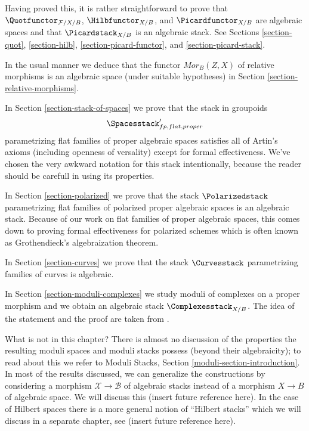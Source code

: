 \medskip\noindent
Having proved this, it is rather straightforward to prove that
$\Quotfunctor_{\mathcal{F}/X/B}$, $\Hilbfunctor_{X/B}$, and
$\Picardfunctor_{X/B}$ are algebraic spaces and that
$\Picardstack_{X/B}$ is an algebraic stack. See
Sections \ref{section-quot}, \ref{section-hilb},
\ref{section-picard-functor}, and \ref{section-picard-stack}.

\medskip\noindent
In the usual manner we deduce that the functor $\mathit{Mor}_B(Z, X)$
of relative morphisms is an algebraic space (under suitable
hypotheses) in Section \ref{section-relative-morphisms}.

\medskip\noindent
In Section \ref{section-stack-of-spaces} we prove that the stack in
groupoids
$$
\Spacesstack'_{fp, flat, proper}
$$
parametrizing flat families of proper algebraic spaces satisfies all
of Artin's axioms (including openness of versality) except for
formal effectiveness. We've chosen the very awkward notation for
this stack intentionally, because the reader should be carefull
in using its properties.

\medskip\noindent
In Section \ref{section-polarized} we prove that the stack
$\Polarizedstack$
parametrizing flat families of polarized proper algebraic spaces
is an algebraic stack. Because of our work on flat families of proper
algebraic spaces, this comes down to proving
formal effectiveness for polarized schemes which is often known
as Grothendieck's algebraization theorem.

\medskip\noindent
In Section \ref{section-curves} we prove that the stack
$\Curvesstack$ parametrizing families of curves is algebraic.

\medskip\noindent
In Section \ref{section-moduli-complexes}
we study moduli of complexes on a proper morphism
and we obtain an algebraic stack $\Complexesstack_{X/B}$.
The idea of the statement and the proof are taken from
\cite{lieblich-complexes}.

\medskip\noindent
What is not in this chapter? There is almost no discussion of
the properties the resulting moduli spaces and moduli stacks
possess (beyond their algebraicity); to read about this we
refer to Moduli Stacks, Section \ref{moduli-section-introduction}.
In most of the results discussed, we can generalize the constructions
by considering a morphism $\mathcal{X} \to \mathcal{B}$ of algebraic
stacks instead of a morphism $X \to B$ of algebraic space.
We will discuss this (insert future reference here).
In the case of Hilbert spaces there is a more general notion of
``Hilbert stacks'' which we will discuss in a separate chapter, see
(insert future reference here).




